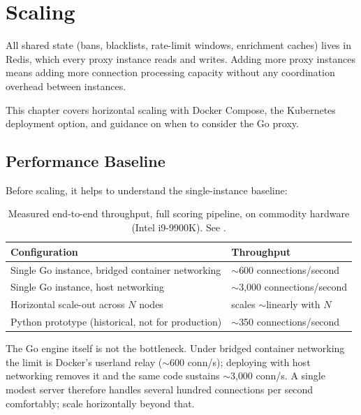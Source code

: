 
\chapter{Scaling}
\label{ch:scaling}

All shared state (bans, blacklists, rate-limit windows, enrichment caches) lives in
Redis, which every proxy instance reads and writes. Adding more proxy instances means
adding more connection processing capacity without any coordination overhead between
instances.

This chapter covers horizontal scaling with Docker Compose, the Kubernetes deployment
option, and guidance on when to consider the Go proxy.

\section{Performance Baseline}

Before scaling, it helps to understand the single-instance baseline:

\begin{table}[ht]
  \small
  \begin{tabularx}{\linewidth}{lX}
    \toprule
    \textbf{Configuration} & \textbf{Throughput} \\
    \midrule
    Single Go instance, bridged container networking & $\sim$600 connections/second \\
    Single Go instance, host networking & $\sim$3{,}000 connections/second \\
    Horizontal scale-out across $N$ nodes & scales $\sim$linearly with $N$ \\
    Python prototype (historical, not for production) & $\sim$350 connections/second \\
    \bottomrule
  \end{tabularx}
  \caption{Measured end-to-end throughput, full scoring pipeline, on commodity
           hardware (Intel i9-9900K). See .}
\end{table}

The Go engine itself is not the bottleneck. Under bridged container networking the
limit is Docker's userland  relay ($\sim$600 conn/s); deploying
with host networking removes it and the same code sustains $\sim$3{,}000 conn/s.
A single modest server therefore handles several hundred connections per second
comfortably; scale horizontally beyond that.

